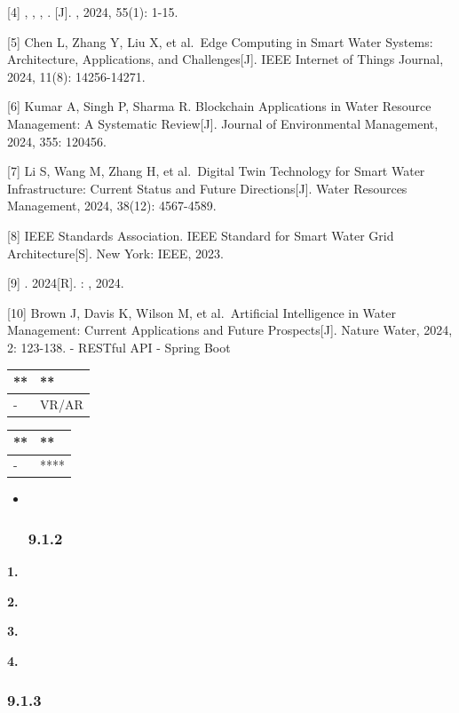 {[}4{]} , , , . {[}J{]}. , 2024, 55(1): 1-15.

{[}5{]} Chen L, Zhang Y, Liu X, et al.~Edge Computing in Smart Water
Systems: Architecture, Applications, and Challenges{[}J{]}. IEEE
Internet of Things Journal, 2024, 11(8): 14256-14271.

{[}6{]} Kumar A, Singh P, Sharma R. Blockchain Applications in Water
Resource Management: A Systematic Review{[}J{]}. Journal of
Environmental Management, 2024, 355: 120456.

{[}7{]} Li S, Wang M, Zhang H, et al.~Digital Twin Technology for Smart
Water Infrastructure: Current Status and Future Directions{[}J{]}. Water
Resources Management, 2024, 38(12): 4567-4589.

{[}8{]} IEEE Standards Association. IEEE Standard for Smart Water Grid
Architecture{[}S{]}. New York: IEEE, 2023.

{[}9{]} . 2024{[}R{]}. : , 2024.

{[}10{]} Brown J, Davis K, Wilson M, et al.~Artificial Intelligence in
Water Management: Current Applications and Future Prospects{[}J{]}.
Nature Water, 2024, 2: 123-138. - RESTful API - Spring Boot

\begin{longtable}[]{@{}ll@{}}
\toprule\noalign{}
** & ** \\
\midrule\noalign{}
\endhead
\bottomrule\noalign{}
\endlastfoot
- & VR/AR \\
\end{longtable}

\begin{longtable}[]{@{}ll@{}}
\toprule\noalign{}
** & ** \\
\midrule\noalign{}
\endhead
\bottomrule\noalign{}
\endlastfoot
- & **** \\
\end{longtable}

\begin{itemize}
\item ~
  \subsubsection{9.1.2}\label{section-22}
\end{itemize}

\textbf{1. }

\textbf{2. }

\textbf{3. }

\textbf{4. }

\subsubsection{9.1.3}\label{section-23}

